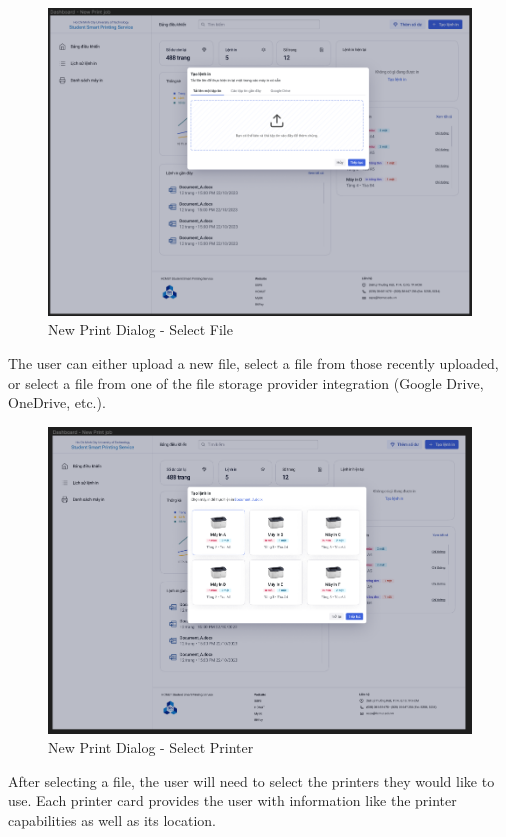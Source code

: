 \begin{figure}[H]
  \includegraphics[max width=0.9\linewidth]{chapters/5. mvp-wireframe/2 - Dashboard - Create Print.png}
  \caption{New Print Dialog - Select File}%
\end{figure}

The user can either upload a new file, select a file from those recently uploaded, or select a file from one of the file storage provider integration (Google Drive, OneDrive, etc.).


\begin{figure}[H]
  \includegraphics[max width=0.9\linewidth]{chapters/5. mvp-wireframe/3 - Dashboard - Select Printer.png}
  \caption{New Print Dialog - Select Printer}%
\end{figure}

After selecting a file, the user will need to select the printers they would like to use. Each printer card provides the user with information like the printer capabilities as well as its location.

